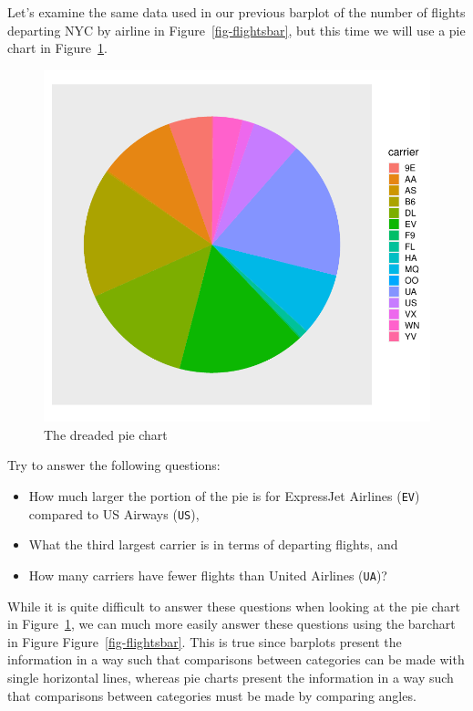 \documentclass[
  letterpaper,
  DIV=11,
  numbers=noendperiod]{scrreprt}
\providecommand{\tightlist}{%
  \setlength{\itemsep}{0pt}\setlength{\parskip}{0pt}}\usepackage{longtable,booktabs,array}
\theoremstyle{definition}
\theoremstyle{remark}
\begin{document}
Let's examine the same data used in our previous barplot of the number
of flights departing NYC by airline in Figure~\ref{fig-flightsbar}, but
this time we will use a pie chart in Figure~\ref{fig-carrierpie}.

\begin{figure}

{\centering \includegraphics{02-visualization_files/figure-pdf/fig-carrierpie-1.pdf}

}

\caption{\label{fig-carrierpie}The dreaded pie chart}

\end{figure}

Try to answer the following questions:

\begin{itemize}
\tightlist
\item
  How much larger the portion of the pie is for ExpressJet Airlines
  (\texttt{EV}) compared to US Airways (\texttt{US}),
\item
  What the third largest carrier is in terms of departing flights, and
\item
  How many carriers have fewer flights than United Airlines
  (\texttt{UA})?
\end{itemize}

While it is quite difficult to answer these questions when looking at
the pie chart in Figure~\ref{fig-carrierpie}, we can much more easily
answer these questions using the barchart in Figure
Figure~\ref{fig-flightsbar}. This is true since barplots present the
information in a way such that comparisons between categories can be
made with single horizontal lines, whereas pie charts present the
information in a way such that comparisons between categories must be
made by comparing angles.
\end{document}
